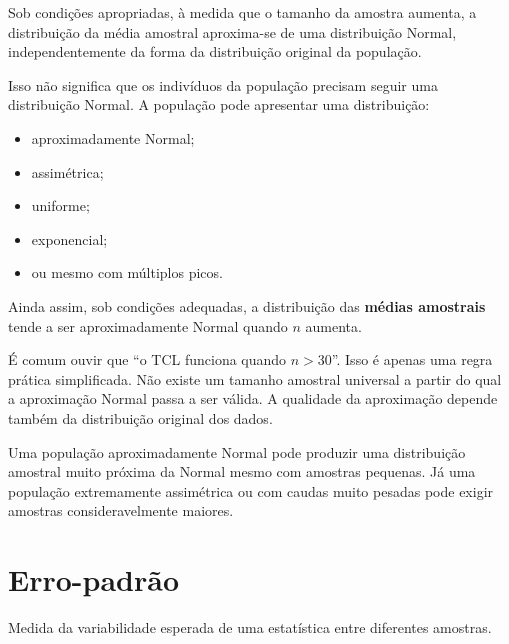 \begin{deepdive}


\begin{definition}
Sob condições apropriadas, à medida que o tamanho da amostra aumenta, a distribuição da média amostral aproxima-se de uma distribuição Normal, independentemente da forma da distribuição original da população.
\end{definition}

Isso não significa que os indivíduos da população precisam seguir uma distribuição Normal. A população pode apresentar uma distribuição:

\begin{itemize}
\item aproximadamente Normal;
\item assimétrica;
\item uniforme;
\item exponencial;
\item ou mesmo com múltiplos picos.
\end{itemize}

Ainda assim, sob condições adequadas, a distribuição das \textbf{médias amostrais} tende a ser aproximadamente Normal quando $n$ aumenta.
\end{deepdive}

\begin{error}

É comum ouvir que ``o TCL funciona quando $n>30$''. Isso é apenas uma regra prática simplificada. Não existe um tamanho amostral universal a partir do qual a aproximação Normal passa a ser válida. A qualidade da aproximação depende também da distribuição original dos dados.

Uma população aproximadamente Normal pode produzir uma distribuição amostral muito próxima da Normal mesmo com amostras pequenas. Já uma população extremamente assimétrica ou com caudas muito pesadas pode exigir amostras consideravelmente maiores.

\end{error}

\section{Erro-padrão}

\begin{definition}
Medida da variabilidade esperada de uma estatística entre diferentes amostras.
\end{definition}

